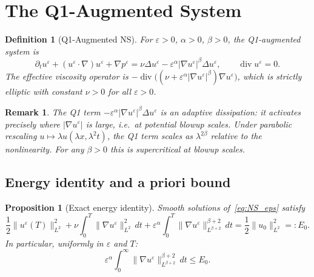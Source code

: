 \documentclass[11pt]{article}
\newtheorem{proposition}[theorem]{Proposition}
\newtheorem{definition}[theorem]{Definition}
\newtheorem*{remark}{Remark}
\newcommand{\eps}{\varepsilon}
\newcommand{\norm}[2]{\|{#1}\|_{#2}}
\begin{document}
\section{The Q1-Augmented System}

\begin{definition}[Q1-Augmented NS]\label{def:Q1}
For $\eps>0$, $\alpha>0$, $\beta>0$, the Q1-augmented system is
\begin{equation}\label{eq:NS_eps}
  \partial_t u^\eps + (u^\eps\cdot\nabla)u^\eps + \nabla p^\eps
  = \nu\Delta u^\eps
    - \eps^\alpha|\nabla u^\eps|^\beta\Delta u^\eps,
  \qquad \operatorname{div}u^\eps = 0.
\end{equation}
The effective viscosity operator is
$-\operatorname{div}\bigl((\nu+\eps^\alpha|\nabla u^\eps|^\beta)\nabla u^\eps\bigr)$,
which is strictly elliptic with constant $\nu>0$ for all $\eps>0$.
\end{definition}

\begin{remark}
The Q1 term $-\eps^\alpha|\nabla u^\eps|^\beta\Delta u^\eps$
is an \emph{adaptive} dissipation: it activates precisely
where $|\nabla u^\eps|$ is large, i.e.\ at potential blowup scales.
Under parabolic rescaling $u\mapsto\lambda u(\lambda x, \lambda^2 t)$,
the Q1 term scales as $\lambda^{2\beta}$ relative to the nonlinearity.
For any $\beta>0$ this is supercritical at blowup scales.
\end{remark}

\subsection{Energy identity and a priori bound}

\begin{proposition}[Exact energy identity]\label{prop:energy}
Smooth solutions of~\eqref{eq:NS_eps} satisfy
\begin{equation}\label{eq:energy}
  \frac{1}{2}\norm{u^\eps(T)}{L^2}^2
  + \nu\int_0^T\norm{\nabla u^\eps}{L^2}^2\,dt
  + \eps^\alpha\int_0^T\norm{\nabla u^\eps}{L^{\beta+2}}^{\beta+2}\,dt
  = \frac{1}{2}\norm{u_0}{L^2}^2 =: E_0.
\end{equation}
In particular, uniformly in $\eps$ and $T$:
\begin{equation}\label{eq:apriori}
  \eps^\alpha\int_0^\infty\norm{\nabla u^\eps}{L^{\beta+2}}^{\beta+2}\,dt
  \le E_0.
\end{equation}
\end{proposition}
\end{document}
